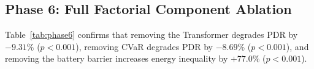 \documentclass[conference]{IEEEtran}
\begin{document}
\subsection{Phase 6: Full Factorial Component Ablation}
\begin{table}[htbp]
\caption{Phase 6 Ablation Study: Proving Component Necessity ($S=20$)}
\label{tab:phase6}
\centering
{}
\end{table}
Table~\ref{tab:phase6} confirms that removing the Transformer degrades PDR by $-9.31\%$ ($p < 0.001$), removing CVaR degrades PDR by $-8.69\%$ ($p < 0.001$), and removing the battery barrier increases energy inequality by $+77.0\%$ ($p < 0.001$).
\end{document}
